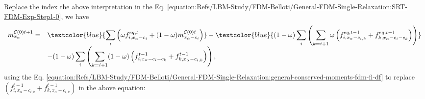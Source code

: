 \documentclass[letterpaper,10pt,english,openany,oneside]{jupyterBook}
\begin{document}
\sphinxAtStartPar
Replace the index the above interpretation in the Eq. \eqref{equation:Refs/LBM-Study/FDM-Belloti/General-FDM-Single-Relaxation:SRT-FDM-Exp-Step1-0}, we have
\begin{equation*}
\begin{split}
\begin{array}{ll}
m_{x_{\alpha}}^{\mathcal{C}(0)t+1} = & \textcolor{blue}{\displaystyle\sum_{i}\left(\omega f_{i,x_{\alpha}-c_{i}}^{eq,t}  + (1-\omega)m_{x_{\alpha}-c_{i}}^{\mathcal{C}(0)t} \right)} - \textcolor{blue}{(1-\omega) \displaystyle\sum_{i}\left( \sum_{k= i+1} \omega \left(f_{i,x_{\alpha}-c_{i,k}}^{eq,t-1} + f_{k,x_{\alpha}-c_{i}-c_{k}}^{eq,t-1} \right) \right)} \\
&- (1-\omega) \displaystyle\sum_{i}\left( \sum_{k= i+1} (1-\omega)\left(f_{i,x_{\alpha}-c_{i}-c_{k}}^{t-1} + f_{k,x_{\alpha}-c_{i,k}}^{t-1}  \right) \right),
\end{array}
\end{split}
\end{equation*}
\sphinxAtStartPar
using the Eq. \eqref{equation:Refs/LBM-Study/FDM-Belloti/General-FDM-Single-Relaxation:general-conserved-moments-fdm-fi-df} to replace \(\left(f_{i,x_{\alpha}-c_{i,k}}^{t-1} + f_{k,x_{\alpha}-c_{i,k}}^{t-1} \right)\) in the above equation:
\end{document}
